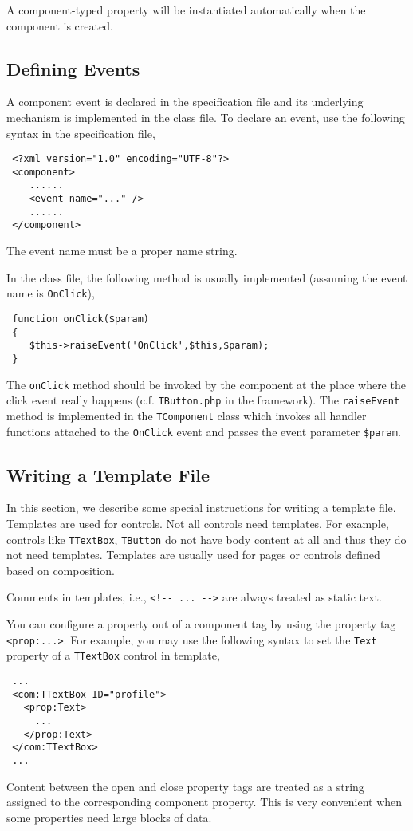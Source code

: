 \documentclass{book}
\begin{document}
A component-typed property will be instantiated automatically when
the component is created.


\subsection{Defining Events}

A component event is declared in the specification file and its
underlying mechanism is implemented in the class file. To declare
an event, use the following syntax in the specification file,
\begin{verbatim}
 <?xml version="1.0" encoding="UTF-8"?>
 <component>
    ......
    <event name="..." />
    ......
 </component>
\end{verbatim}
The event name must be a proper name string.


In the class file, the following method is usually implemented
(assuming the event name is \verb|OnClick|),
\begin{verbatim}
 function onClick($param)
 {
    $this->raiseEvent('OnClick',$this,$param);
 }
\end{verbatim}
The \verb|onClick| method should be invoked by the component at
the place where the click event really happens (c.f.
\verb|TButton.php| in the framework). The \verb|raiseEvent| method
is implemented in the \verb|TComponent| class which invokes all
handler functions attached to the \verb|OnClick| event and passes
the event parameter \verb|$param|.


\subsection{Writing a Template File}

In this section, we describe some special instructions for writing
a template file. Templates are used for controls. Not all controls
need templates. For example, controls like \verb|TTextBox|,
\verb|TButton| do not have body content at all and thus they do
not need templates. Templates are usually used for pages or
controls defined based on composition.


Comments in templates, i.e., \verb|<!-- ... -->| are always
treated as static text.


You can configure a property out of a component tag by using the
property tag \verb|<prop:...>|. For example, you may use the
following syntax to set the \verb|Text| property of a
\verb|TTextBox| control in template,
\begin{verbatim}
 ...
 <com:TTextBox ID="profile">
   <prop:Text>
     ...
   </prop:Text>
 </com:TTextBox>
 ...
\end{verbatim}
Content between the open and close property tags are treated as a
string assigned to the corresponding component property. This is
very convenient when some properties need large blocks of data.
\end{document}
